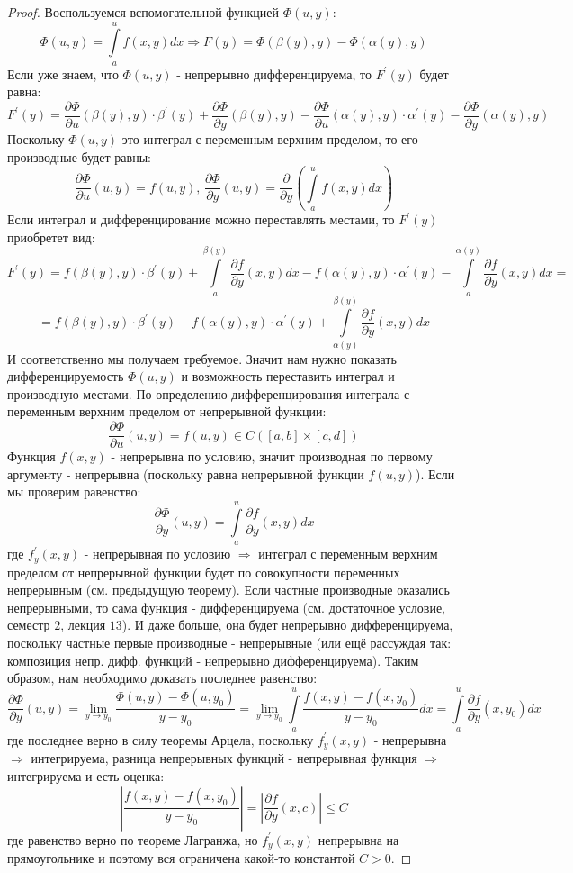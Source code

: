 \documentclass[12pt]{article}
\theoremstyle{definition}
\newcommand{\ddint}[2]{\displaystyle\int\limits_{#1}^{#2}}
\begin{document}
\begin{proof}
	Воспользуемся вспомогательной функцией $\Phi(u,y)$:
	$$
		\Phi(u,y) = \ddint{a}{u}f(x,y)dx \Rightarrow F(y) = \Phi(\beta(y),y) - \Phi(\alpha(y),y)
	$$
	Если уже знаем, что $\Phi(u,y)$ - непрерывно дифференцируема, то $F^\prime(y)$ будет равна:
	$$
		F^\prime(y) = \dfrac{\partial \Phi}{\partial u}(\beta(y),y){\cdot}\beta^\prime(y) + \dfrac{\partial \Phi}{\partial y}(\beta(y),y)  - \dfrac{\partial \Phi}{\partial u}(\alpha(y),y){\cdot}\alpha^\prime(y) - \dfrac{\partial \Phi}{\partial y}(\alpha(y),y)
	$$
	Поскольку $\Phi(u,y)$ это интеграл с переменным верхним пределом, то его производные будет равны:
	$$
		\dfrac{\partial \Phi}{\partial u}(u,y) = f(u,y), \, \dfrac{\partial \Phi}{\partial y}(u,y) = \dfrac{\partial}{\partial y} \left(\ddint{a}{u}f(x,y)dx\right)
	$$
	Если интеграл и дифференцирование можно переставлять местами, то $F^\prime(y)$ приобретет вид:
	$$
		F^\prime(y) = f(\beta(y),y){\cdot}\beta^\prime(y) + \ddint{a}{\beta(y)}\dfrac{\partial f}{\partial y}(x,y)dx - f(\alpha(y),y){\cdot}\alpha^\prime(y) - \ddint{a}{\alpha(y)}\dfrac{\partial f}{\partial y}(x,y)dx =
	$$
	$$
		=  f(\beta(y),y){\cdot}\beta^\prime(y) - f(\alpha(y),y){\cdot}\alpha^\prime(y) + \ddint{\alpha(y)}{\beta(y)}\dfrac{\partial f}{\partial y}(x,y)dx
	$$
	И соответственно мы получаем требуемое. Значит нам нужно показать дифференцируемость $\Phi(u,y)$ и возможность переставить интеграл и производную местами. По определению дифференцирования интеграла с переменным верхним пределом от непрерывной функции:
	$$
		\dfrac{\partial \Phi}{\partial u}(u,y) = f(u,y) \in C([a,b]\times [c,d])
	$$
	Функция $f(x,y)$ - непрерывна по условию, значит производная по первому аргументу - непрерывна (поскольку равна непрерывной функции $f(u,y)$). Если мы проверим равенство:
	$$
		\dfrac{\partial \Phi}{\partial y}(u,y) =  \ddint{a}{u}\dfrac{\partial f}{\partial y}(x,y)dx
	$$
	где $f_y^\prime(x,y)$ - непрерывная по условию $\Rightarrow$ интеграл с переменным верхним пределом от непрерывной функции будет по совокупности переменных непрерывным (см. предыдущую теорему). Если частные производные оказались непрерывными, то сама функция - дифференцируема (см. достаточное условие, семестр $2$, лекция $13$). И даже больше, она будет непрерывно дифференцируема, поскольку частные первые производные - непрерывные (или ещё рассуждая так: композиция непр. дифф. функций - непрерывно дифференцируема). Таким образом, нам необходимо доказать последнее равенство:
	$$
		\dfrac{\partial \Phi}{\partial y}(u,y) =	\lim\limits_{y \to y_0} \dfrac{\Phi(u,y) - \Phi(u,y_0)}{y - y_0} = \lim\limits_{y \to y_0}\ddint{a}{u}\dfrac{f(x,y) - f(x,y_0)}{y - y_0}dx = \ddint{a}{u}\dfrac{\partial f}{\partial y}(x,y_0)dx
	$$
	где последнее верно в силу теоремы Арцела, поскольку $f_y^\prime(x,y)$ - непрерывна $\Rightarrow$ интегрируема, разница непрерывных функций - непрерывная функция $\Rightarrow$ интегрируема и есть оценка:
	$$
		\left| \dfrac{f(x,y) - f(x,y_0)}{y - y_0} \right| = \left| \dfrac{\partial f}{\partial y}(x,c) \right| \leq C
	$$
	где равенство верно по теореме Лагранжа, но $f_y^\prime(x,y)$ непрерывна на прямоугольнике и поэтому вся ограничена какой-то константой $C > 0$.
	

\end{proof}
\end{document}
